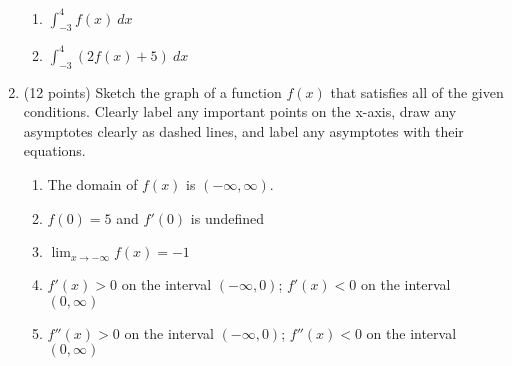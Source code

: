 \documentclass[12pt]{article}
\begin{document}
\begin{enumerate}
\begin{center}
\end{center}

\begin{enumerate}
\item $\displaystyle{\int_{-3}^4 f(x) \: dx}$
\vfill
\item
$\displaystyle{\int_{-3}^4 (2 f(x)+5) \: dx}$
\vfill
\end{enumerate}
\newpage
\item (12 points) Sketch the graph of a function $f(x)$ that satisfies all of the given conditions. Clearly label any important points on the x-axis, draw any asymptotes clearly as dashed lines, and label any asymptotes with their equations.
\begin{enumerate}
\item The domain of $f(x)$ is $(-\infty, \infty).$
\item $f(0)=5$ and $f'(0)$ is undefined
\item $\displaystyle{\lim_{x \to -\infty} f(x)=-1}$
\item $f'(x) >0$ on the interval $(-\infty,0)$; $f'(x) < 0$ on the interval $(0, \infty)$
\item $f''(x) >0$ on the interval $(-\infty, 0)$; $f''(x) <0$ on the interval $(0,\infty)$
\end{enumerate}

\begin{center}
\end{center}



\end{enumerate}
\end{document}
